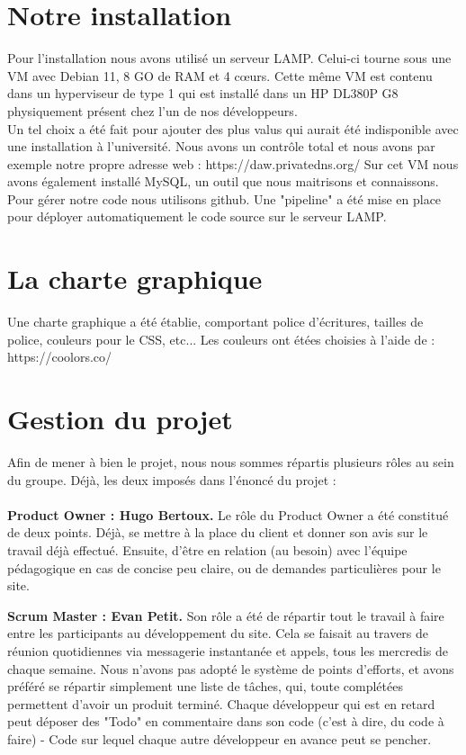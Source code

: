 \documentclass[a4paper,11pt]{article}
\begin{document}
\section{Notre installation}
Pour l'installation nous avons utilisé un serveur LAMP. Celui-ci tourne sous une VM avec Debian 11, 8 GO de RAM et 4 cœurs. Cette même VM est contenu dans un hyperviseur de type 1 qui est installé dans un HP DL380P G8 physiquement présent chez l'un de nos développeurs. \\
Un tel choix a été fait pour ajouter des plus valus qui aurait été indisponible avec une installation à l'université. Nous avons un contrôle total et nous avons par exemple notre propre adresse web : https://daw.privatedns.org/ 
Sur cet VM nous avons également installé MySQL, un outil que nous maitrisons et connaissons. \\ 
Pour gérer notre code nous utilisons github. Une "pipeline" a été mise en place pour déployer automatiquement le code source sur le serveur LAMP.

\section{La charte graphique}
Une charte graphique a été établie, comportant police d'écritures, tailles de police, couleurs pour le CSS, etc...
Les couleurs ont étées choisies à l'aide de : https://coolors.co/

\section{Gestion du projet}
Afin de mener à bien le projet, nous nous sommes répartis plusieurs rôles au sein du groupe. Déjà, les deux imposés dans l'énoncé du projet :\\\\

\textbf{Product Owner : Hugo Bertoux.} Le rôle du Product Owner a été constitué de deux points. Déjà, se mettre à la place du client et donner son avis sur le travail déjà effectué. Ensuite, d'être en relation (au besoin) avec l'équipe pédagogique en cas de concise peu claire, ou de demandes particulières pour le site.

\textbf{Scrum Master : Evan Petit.} Son rôle a été de répartir tout le travail à faire entre les participants au développement du site. Cela se faisait au travers de réunion quotidiennes via messagerie instantanée et appels, tous les mercredis de chaque semaine. Nous n'avons pas adopté le système de points d'efforts, et avons préféré se répartir simplement une liste de tâches, qui, toute complétées permettent d'avoir un produit terminé. Chaque développeur qui est en retard peut déposer des "Todo" en commentaire dans son code (c'est à dire, du code à faire) - Code sur lequel chaque autre développeur en avance peut se pencher.\\
\end{document}
